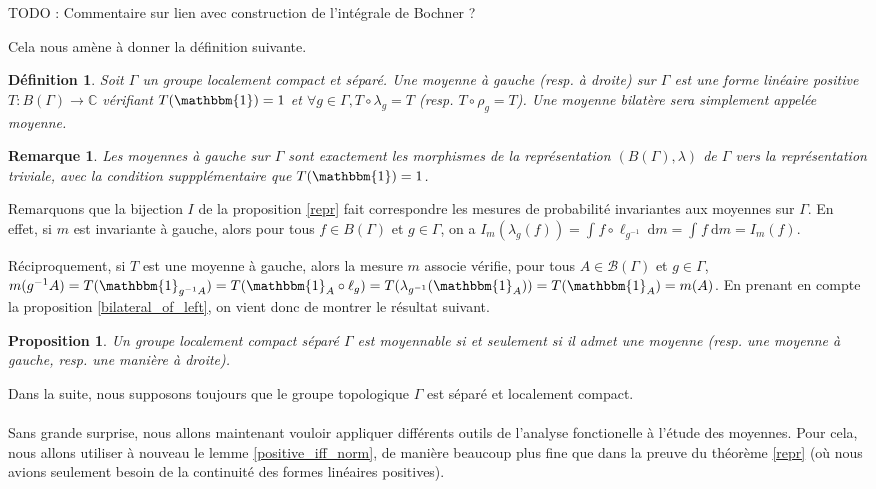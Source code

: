 \documentclass[a4paper,12pt]{article}
\newtheorem{proposition}[theorem]{Proposition}
\newtheorem{definition}[theorem]{Définition}
\newtheorem{remark}[theorem]{Remarque}
\newcommand{\C}{\mathbb{C}}
\newcommand{\Bor}{\mathcal{B}}
\newcommand{\indic}{\mathbbm{1}}
\newcommand{\integral}[4]{\int_{#1}^{#2} #3~\mathrm{d}#4}
\newcommand{\ssi}{si et seulement si }
\newcommand{\inv}{^{-1}}
\newcommand{\comp}{\circ}
\newcommand{\TODO}[1]{{\color{red}TODO :} #1}
\begin{document}
\TODO{Commentaire sur lien avec construction de l'intégrale de Bochner ?}

Cela nous amène à donner la définition suivante.

\begin{definition}
    Soit $\Gamma$ un groupe localement compact et séparé. Une \emph{moyenne à gauche} (resp. \emph{à droite}) sur $\Gamma$ est une forme 
    linéaire positive $T : B(\Gamma)\to\C$ vérifiant $T(\indic) = 1$ et $\forall g\in\Gamma, T\comp\lambda_g = T$
    (resp. $T\comp\rho_g = T$). Une moyenne bilatère sera simplement appelée \emph{moyenne}.
\end{definition}

\begin{remark}
    Les moyennes à gauche sur $\Gamma$ sont exactement les morphismes de la représentation $(B(\Gamma), \lambda)$ de 
    $\Gamma$ vers la représentation triviale, avec la condition suppplémentaire que $T(\indic) = 1$.
\end{remark}

Remarquons que la bijection $I$ de la proposition \ref{repr} fait correspondre les mesures de probabilité 
invariantes aux moyennes sur $\Gamma$. En effet, si $m$ est invariante à gauche, alors pour tous 
$f\in B(\Gamma)$ et $g\in\Gamma$, on a 
$I_m(\lambda_g(f)) = \integral{}{}{f\comp\ell_{g\inv}}{m} = \integral{}{}{f}{m} = I_m(f)$. 

Réciproquement, si $T$ est une 
moyenne à gauche, alors la mesure $m$ associe vérifie, pour tous $A\in\Bor(\Gamma)$ et $g\in\Gamma$, 
$m(g\inv A) = T(\indic_{g\inv A}) = T(\indic_A \comp\ell_g) = T(\lambda_{g\inv}(\indic_A)) = T(\indic_A) = m(A)$.
En prenant en compte la proposition \ref{bilateral_of_left}, on vient donc de montrer le résultat suivant.
\begin{proposition}
    Un groupe localement compact séparé $\Gamma$ est moyennable \ssi il admet une moyenne (resp. une moyenne à gauche, resp. une manière à droite).
\end{proposition}

Dans la suite, nous supposons toujours que le groupe topologique $\Gamma$ est séparé et localement compact.
\paragraph{}

Sans grande surprise, nous allons maintenant vouloir appliquer différents outils de l'analyse fonctionelle à l'étude des moyennes.
Pour cela, nous allons utiliser à nouveau le lemme \ref{positive_iff_norm}, de manière beaucoup plus fine que dans la preuve 
du théorème \ref{repr} (où nous avions seulement besoin de la continuité des formes linéaires positives).
\end{document}
